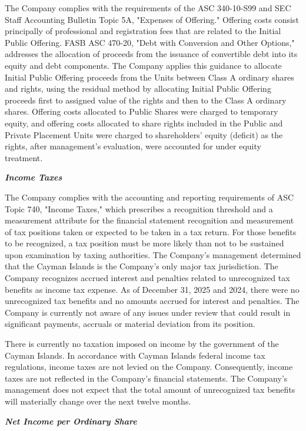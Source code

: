 \documentclass[11pt,a4paper]{article}
\begin{document}
The Company complies with the requirements of the ASC 340-10-S99 and SEC Staff Accounting Bulletin Topic 5A, "Expenses of Offering." Offering costs consist principally of professional and registration fees that are related to the Initial Public Offering. FASB ASC 470-20, "Debt with Conversion and Other Options," addresses the allocation of proceeds from the issuance of convertible debt into its equity and debt components. The Company applies this guidance to allocate Initial Public Offering proceeds from the Units between Class A ordinary shares and rights, using the residual method by allocating Initial Public Offering proceeds first to assigned value of the rights and then to the Class A ordinary shares. Offering costs allocated to Public Shares were charged to temporary equity, and offering costs allocated to share rights included in the Public and Private Placement Units were charged to shareholders' equity (deficit) as the rights, after management's evaluation, were accounted for under equity treatment.

\textit{\textbf{Income Taxes}}

The Company complies with the accounting and reporting requirements of ASC Topic 740, "Income Taxes," which prescribes a recognition threshold and a measurement attribute for the financial statement recognition and measurement of tax positions taken or expected to be taken in a tax return. For those benefits to be recognized, a tax position must be more likely than not to be sustained upon examination by taxing authorities. The Company's management determined that the Cayman Islands is the Company's only major tax jurisdiction. The Company recognizes accrued interest and penalties related to unrecognized tax benefits as income tax expense. As of December 31, 2025 and 2024, there were no unrecognized tax benefits and no amounts accrued for interest and penalties. The Company is currently not aware of any issues under review that could result in significant payments, accruals or material deviation from its position.

There is currently no taxation imposed on income by the government of the Cayman Islands. In accordance with Cayman Islands federal income tax regulations, income taxes are not levied on the Company. Consequently, income taxes are not reflected in the Company's financial statements. The Company's management does not expect that the total amount of unrecognized tax benefits will materially change over the next twelve months.

\textit{\textbf{Net Income per Ordinary Share}}
\end{document}
